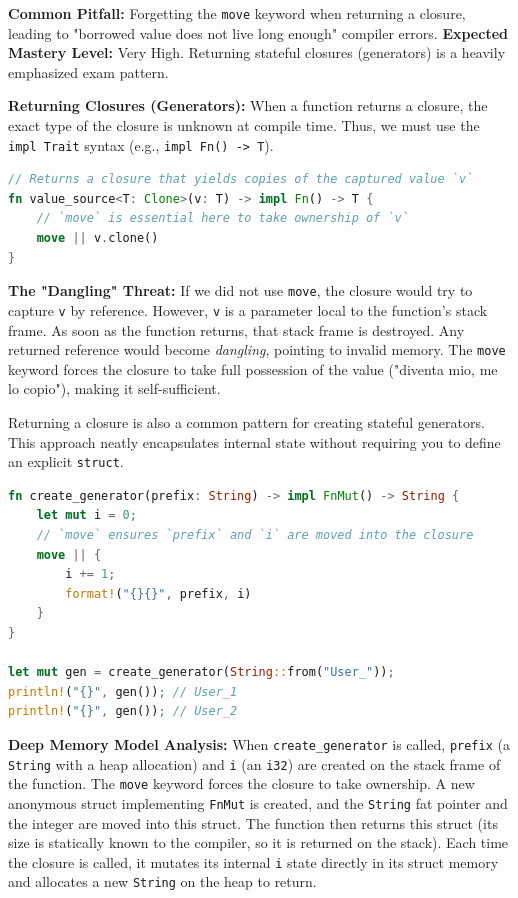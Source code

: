 \begin{examprioritybox}
\textbf{Common Pitfall:} Forgetting the \texttt{move} keyword when returning a closure, leading to "borrowed value does not live long enough" compiler errors.
\textbf{Expected Mastery Level:} Very High. Returning stateful closures (generators) is a heavily emphasized exam pattern.

\textbf{Returning Closures (Generators):}
When a function returns a closure, the exact type of the closure is unknown at compile time. Thus, we must use the \texttt{impl Trait} syntax (e.g., \texttt{impl Fn() -> T}).

\begin{lstlisting}[language=Rust]
// Returns a closure that yields copies of the captured value `v`
fn value_source<T: Clone>(v: T) -> impl Fn() -> T {
    // `move` is essential here to take ownership of `v`
    move || v.clone() 
}
\end{lstlisting}

\begin{warningbox}
\textbf{The "Dangling" Threat:} If we did not use \texttt{move}, the closure would try to capture \texttt{v} by reference. However, \texttt{v} is a parameter local to the function's stack frame. As soon as the function returns, that stack frame is destroyed. Any returned reference would become \textit{dangling}, pointing to invalid memory. The \texttt{move} keyword forces the closure to take full possession of the value ("diventa mio, me lo copio"), making it self-sufficient.
\end{warningbox}

Returning a closure is also a common pattern for creating stateful generators. This approach neatly encapsulates internal state without requiring you to define an explicit \texttt{struct}.

\begin{lstlisting}[language=Rust]
fn create_generator(prefix: String) -> impl FnMut() -> String {
    let mut i = 0;
    // `move` ensures `prefix` and `i` are moved into the closure
    move || {
        i += 1;
        format!("{}{}", prefix, i)
    }
}

let mut gen = create_generator(String::from("User_"));
println!("{}", gen()); // User_1
println!("{}", gen()); // User_2
\end{lstlisting}

\textbf{Deep Memory Model Analysis:} When \texttt{create\_generator} is called, \texttt{prefix} (a \texttt{String} with a heap allocation) and \texttt{i} (an \texttt{i32}) are created on the stack frame of the function. The \texttt{move} keyword forces the closure to take ownership. A new anonymous struct implementing \texttt{FnMut} is created, and the \texttt{String} fat pointer and the integer are moved into this struct. The function then returns this struct (its size is statically known to the compiler, so it is returned on the stack). Each time the closure is called, it mutates its internal \texttt{i} state directly in its struct memory and allocates a new \texttt{String} on the heap to return.
\end{examprioritybox}

